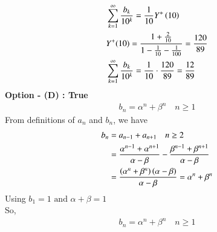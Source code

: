 \documentclass[journal,12pt,twocolumn]{IEEEtran}
\renewcommand\thesection{\arabic{section}}
\begin{document}
\begin{enumerate}[label=\thesection.\arabic*,ref=\thesection.\theenumi]
\begin{align}
	&\sum_{k=1}^{\infty}\frac{b_k}{10^k} = \frac{1}{10}Y^{+}\left({10}\right) \\
	&Y^+(10) = \frac{1 + \frac{2}{10}}{1 - \frac{1}{10} - \frac{1}{100}} = \frac{120}{89} \\
	&\sum_{k=1}^{\infty}\frac{b_k}{10^k} = \frac{1}{10} \cdot \frac{120}{89} = \frac{12}{89}
\end{align}
\textbf{Option - (D) : True}
\begin{align}
	b_n = \alpha^n + \beta^n \quad n \geq 1
\end{align}
From definitions of $a_n$ and $b_n$, we have
\begin{align}
	b_n &= a_{n-1} + a_{n+1} \quad n \geq 2\\
	&= \frac{\alpha^{n-1} + \alpha^{n+1}}{\alpha - \beta} - \frac{\beta^{n-1} + \beta^{n+1}}{\alpha - \beta} \\
	&= \frac{\left(\alpha^n + \beta^n\right)\left(\alpha-\beta\right)}{\alpha - \beta} = \alpha^n + \beta^n 
\end{align}
Using $b_1 = 1 \text{ and } \alpha + \beta = 1$ \\
So, 
\begin{align}
b_n = \alpha^n + \beta^n \quad n \geq 1
\end{align}
\end{enumerate}
\end{document}
